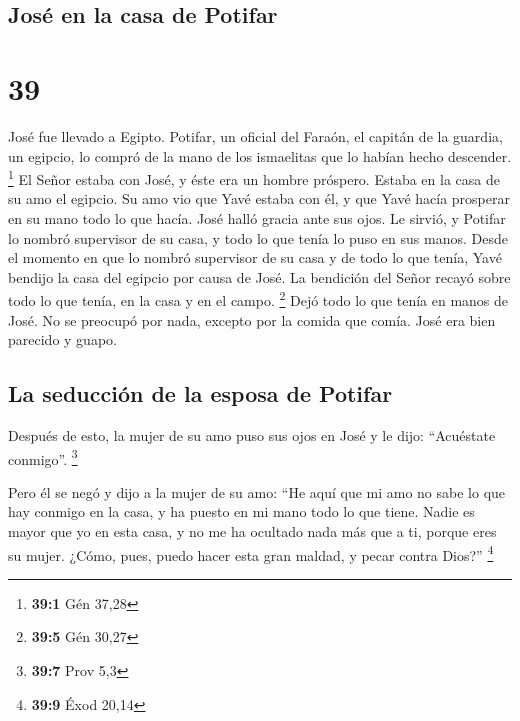 \hypertarget{josuxe9-en-la-casa-de-potifar}{%
\subsection{José en la casa de
Potifar}\label{josuxe9-en-la-casa-de-potifar}}

\hypertarget{section-38}{%
\section{39}\label{section-38}}

 José fue llevado a Egipto. Potifar, un oficial del
Faraón, el capitán de la guardia, un egipcio, lo compró de la mano de
los ismaelitas que lo habían hecho descender. \footnote{\textbf{39:1}
  Gén 37,28}  El Señor estaba con José, y éste era un
hombre próspero. Estaba en la casa de su amo el egipcio. 
Su amo vio que Yavé estaba con él, y que Yavé hacía prosperar en su mano
todo lo que hacía.  José halló gracia ante sus ojos. Le
sirvió, y Potifar lo nombró supervisor de su casa, y todo lo que tenía
lo puso en sus manos.  Desde el momento en que lo nombró
supervisor de su casa y de todo lo que tenía, Yavé bendijo la casa del
egipcio por causa de José. La bendición del Señor recayó sobre todo lo
que tenía, en la casa y en el campo. \footnote{\textbf{39:5} Gén 30,27}
 Dejó todo lo que tenía en manos de José. No se preocupó
por nada, excepto por la comida que comía. José era bien parecido y
guapo.

\hypertarget{la-seducciuxf3n-de-la-esposa-de-potifar}{%
\subsection{La seducción de la esposa de
Potifar}\label{la-seducciuxf3n-de-la-esposa-de-potifar}}

 Después de esto, la mujer de su amo puso sus ojos en José
y le dijo: ``Acuéstate conmigo''. \footnote{\textbf{39:7} Prov 5,3}

 Pero él se negó y dijo a la mujer de su amo: ``He aquí
que mi amo no sabe lo que hay conmigo en la casa, y ha puesto en mi mano
todo lo que tiene.  Nadie es mayor que yo en esta casa, y
no me ha ocultado nada más que a ti, porque eres su mujer. ¿Cómo, pues,
puedo hacer esta gran maldad, y pecar contra Dios?'' \footnote{\textbf{39:9}
  Éxod 20,14}

